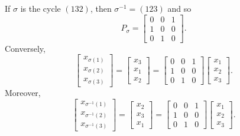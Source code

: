 \begin{test}
    If $\sigma$ is the cycle $(132)$, then $\sigma^{-1}=(123)$ and so
    $$
        P_\sigma=\begin{bmatrix}
                0   &0  &1\\
                1   &0  &0\\
                0   &1  &0
            \end{bmatrix}.
    $$
    Conversely,
    $$
        \begin{bmatrix}
                x_{\sigma(1)}\\
                x_{\sigma(2)}\\
                x_{\sigma(3)}
            \end{bmatrix}
            = \begin{bmatrix}
                x_3\\
                x_1\\
                x_2
            \end{bmatrix}
            = \begin{bmatrix}
                0   &0  &1\\
                1   &0  &0\\
                0   &1  &0
            \end{bmatrix}\begin{bmatrix}
                x_1\\
                x_2\\
                x_3
            \end{bmatrix}\!\!.
    $$
    Moreover,
    $$
        \begin{bmatrix}
                x_{\sigma^{-1}(1)}\\
                x_{\sigma^{-1}(2)}\\
                x_{\sigma^{-1}(3)}
            \end{bmatrix}
            = \begin{bmatrix}
                x_2\\
                x_3\\
                x_1
            \end{bmatrix}
            = \begin{bmatrix}
                0   &0  &1\\
                1   &0  &0\\
                0   &1  &0
            \end{bmatrix}\begin{bmatrix}
                x_1\\
                x_2\\
                x_3
            \end{bmatrix}\!\!.
    $$
\end{test}

